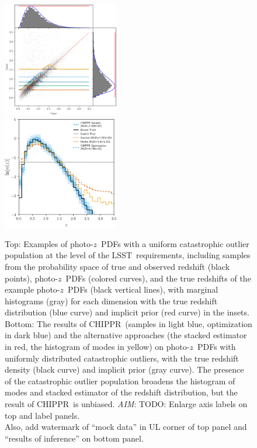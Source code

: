 \documentclass[iop]{emulateapj}
\newcommand{\todo}[3]{{\color{#2}\emph{#1}: #3}}
\newcommand{\aim}[1]{\todo{AIM}{red}{#1}}
\newcommand{\project}[1]{\textsc{#1}}
\newcommand{\lsst}{\project{LSST}}
\newcommand{\Chippr}{\project{CHIPPR}}%
\newcommand{\pz}{photo-$z$}
\newcommand{\pzpdf}{\pz\ PDF}%
\begin{document}
\begin{figure}
	\begin{center}
	\includegraphics[width=0.45\textwidth]{figures/chippr/single_uout_mega_scatter.png}\\
	\includegraphics[width=0.45\textwidth]{figures/chippr/single_uout_log_estimators.png}
	\caption{
		Top: Examples of \pzpdf s with a uniform catastrophic outlier population at the level of the \lsst\ requirements, including samples from the probability space of true and observed redshift (black points), \pzpdf s (colored curves), and the true redshifts of the example \pzpdf s (black vertical lines), with marginal histograms (gray) for each dimension with the true redshift distribution (blue curve) and implicit prior (red curve) in the insets.
		Bottom: The results of \Chippr\ (samples in light blue, optimization in dark blue) and the alternative approaches (the stacked estimator in red, the histogram of modes in yellow) on \pzpdf s with uniformly distributed catastrophic outliers, with the true redshift density (black curve) and implicit prior (gray curve).
		The presence of the catastrophic outlier population broadens the histogram of modes and stacked estimator of the redshift distribution, but the result of \Chippr\ is unbiased.
		\aim{TODO: Enlarge axis labels on top and label panels.\\
		Also, add watermark of ``mock data'' in UL corner of top panel and ``results of inference'' on bottom panel.}
	}
	\label{fig:uniform-outliers}
	\end{center}
\end{figure}
\end{document}
